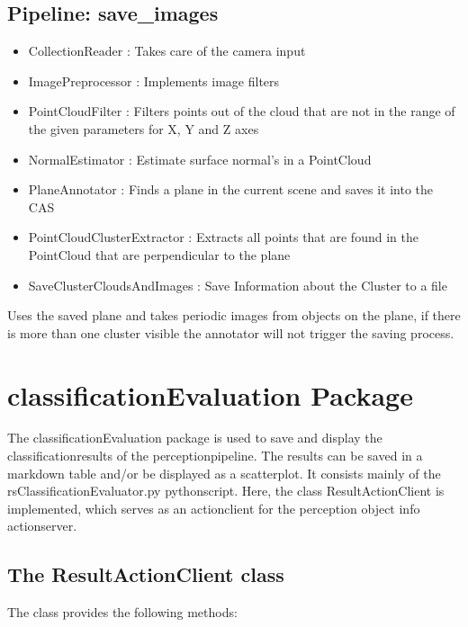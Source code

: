\documentclass[main.tex]{subfiles}
\begin{document}
			\subsection{Pipeline: save\_images}
\begin{itemize}
	\item CollectionReader : Takes care of the camera input
	\item ImagePreprocessor : Implements image filters  
	\item PointCloudFilter : Filters points out of the cloud that are not in the range of the given parameters for X, Y and Z axes
	\item NormalEstimator : Estimate surface normal's in a PointCloud 
	\item PlaneAnnotator : Finds a plane in the current scene and saves it into the CAS
	\item PointCloudClusterExtractor : Extracts all points that are found in the PointCloud that are perpendicular to the plane 
	\item SaveClusterCloudsAndImages : Save Information about the Cluster to a file 
\end{itemize}
Uses the saved plane and takes periodic images from objects on the plane, if there is more than one cluster visible the annotator will not trigger the saving process.

\section{classificationEvaluation Package}

The classificationEvaluation package is used to save and display the classificationresults of the perceptionpipeline. The results can be saved in a markdown table and/or be displayed as a scatterplot. It consists mainly of the rsClassificationEvaluator.py pythonscript. Here, the class ResultActionClient is implemented, which serves as an actionclient for the perception object info actionserver.\\

\subsection{The ResultActionClient class}
The class provides the following methods:
\end{document}
